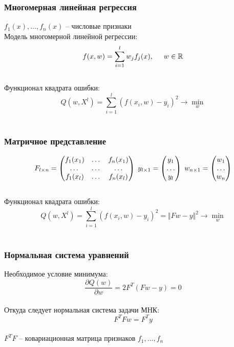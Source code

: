 \documentclass[12pt]{beamer}
\begin{document}
\begin{frame}\frametitle{Многомерная линейная регрессия}
$f_1(x), \dots, f_n(x)$ -- числовые признаки\\
Модель многомерной линейной регрессии:\\
$$f (x, w) = \sum\limits_{i=1}^l w_j f_j(x), \hspace{5mm} w \in \mathbb{R}$$\\
\vspace{5mm}
Функционал квадрата ошибки:\\
$$Q(w,X^l) = \sum\limits_{i=1}^l (f (x_i, w) - y_i)^2  \rightarrow \min\limits_{w}$$\\

\end{frame}

\begin{frame}\frametitle{Матричное представление}
$$F_{l \times n} = \begin{pmatrix}
  f_1(x_1) & \dots & f_n(x_1) \\
  \dots & \dots & \dots\\
  f_1(x_l) & \dots & f_n(x_l)
 \end{pmatrix} \hspace{1mm} y_{l \times 1} = \begin{pmatrix}
  y_1 \\
  \dots\\
  y_l
 \end{pmatrix} \hspace{1mm} w_{n \times 1} = \begin{pmatrix}
  w_1 \\
  \dots\\
  w_n
 \end{pmatrix}$$ \\
\vspace{5mm}
Функционал квадрата ошибки:\\
$$Q(w,X^l) = \sum\limits_{i=1}^l (f (x_i, w) - y_i)^2  = \Vert Fw - y \Vert^2 \rightarrow \min\limits_{w}$$\\

\end{frame}

\begin{frame}\frametitle{Нормальная система уравнений}
Необходимое условие минимума:\\
$$\frac{\partial Q(w)}{\partial w}  = 2 F^T(F w - y) = 0$$\\
Откуда следует нормальная система задачи МНК:\\
$$F^TFw = F^Ty$$\\
$F^TF$ -- ковариационная матрица признаков $f_1, \dots, f_n$\\
\end{frame}
\end{document}
